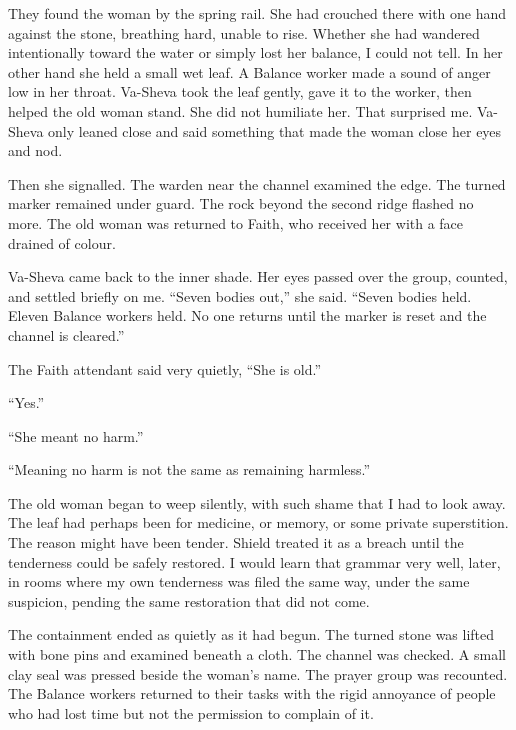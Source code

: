 They found the woman by the spring rail. She had crouched there with one hand against the stone, breathing hard, unable to rise. Whether she had wandered intentionally toward the water or simply lost her balance, I could not tell. In her other hand she held a small wet leaf. A Balance worker made a sound of anger low in her throat. Va-Sheva took the leaf gently, gave it to the worker, then helped the old woman stand. She did not humiliate her. That surprised me. Va-Sheva only leaned close and said something that made the woman close her eyes and nod.\par

Then she signalled. The warden near the channel examined the edge. The turned marker remained under guard. The rock beyond the second ridge flashed no more. The old woman was returned to Faith, who received her with a face drained of colour.\par

Va-Sheva came back to the inner shade. Her eyes passed over the group, counted, and settled briefly on me. ``Seven bodies out,'' she said. ``Seven bodies held. Eleven Balance workers held. No one returns until the marker is reset and the channel is cleared.''\par

The Faith attendant said very quietly, ``She is old.''\par

``Yes.''\par

``She meant no harm.''\par

``Meaning no harm is not the same as remaining harmless.''\par

The old woman began to weep silently, with such shame that I had to look away. The leaf had perhaps been for medicine, or memory, or some private superstition. The reason might have been tender. Shield treated it as a breach until the tenderness could be safely restored. I would learn that grammar very well, later, in rooms where my own tenderness was filed the same way, under the same suspicion, pending the same restoration that did not come.\par

The containment ended as quietly as it had begun. The turned stone was lifted with bone pins and examined beneath a cloth. The channel was checked. A small clay seal was pressed beside the woman's name. The prayer group was recounted. The Balance workers returned to their tasks with the rigid annoyance of people who had lost time but not the permission to complain of it.\par

